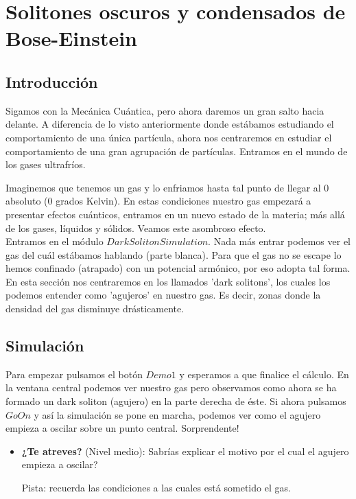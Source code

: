 \section{Solitones oscuros y condensados de Bose-Einstein}

\subsection{Introducci\'on}
Sigamos con la Mec\'anica Cu\'antica, pero ahora daremos un gran salto hacia delante. A diferencia de lo visto anteriormente donde est\'abamos estudiando el comportamiento de una \'unica part\'icula, ahora nos centraremos en estudiar el comportamiento de una gran agrupaci\'on de part\'iculas. Entramos en el mundo de los gases ultrafr\'ios.
\

Imaginemos que tenemos un gas y lo enfriamos hasta tal punto de llegar al 0 absoluto (0 grados Kelvin). En estas condiciones nuestro gas empezar\'a a presentar efectos cu\'anticos, entramos en un nuevo estado de la materia; m\'as all\'a de los gases, l\'iquidos y s\'olidos. Veamos este asombroso efecto.
\\

Entramos en el m\'odulo $Dark Soliton Simulation$. Nada m\'as entrar podemos ver el gas del cu\'al est\'abamos hablando (parte blanca). Para que el gas no se escape lo hemos confinado (atrapado) con un potencial arm\'onico, por eso adopta tal forma. En esta secci\'on nos centraremos en los llamados 'dark solitons', los cuales los podemos entender como 'agujeros' en nuestro gas. Es decir, zonas donde la densidad del gas disminuye dr\'asticamente.


\subsection{Simulaci\'on}
Para empezar pulsamos el bot\'on $Demo 1$ y esperamos a que finalice el c\'alculo. En la ventana central podemos ver nuestro gas pero observamos como ahora se ha formado un dark soliton (agujero) en la parte derecha de \'este. Si ahora pulsamos $Go On$ y as\'i la simulaci\'on se pone en marcha, podemos ver como el agujero empieza a oscilar sobre un punto central. Sorprendente!

\begin{itemize}
	\item \textbf{¿Te atreves?} (Nivel medio): Sabr\'ias explicar el motivo por el cual el agujero empieza a oscilar?
	
	Pista: recuerda las condiciones a las cuales est\'a sometido el gas.
\end{itemize}

